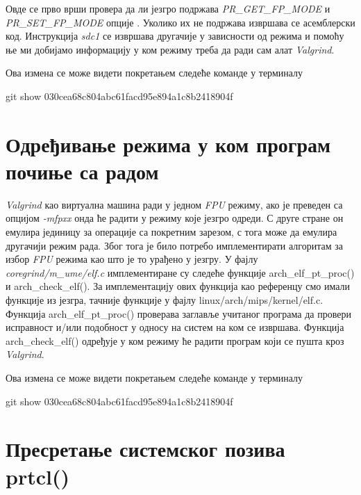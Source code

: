 \documentclass[12pt,oneside]{memoir}
\begin{document}
\indent Овде се прво врши провера да ли језгро подржава \textit{PR\_GET\_FP\_MODE} и \textit{PR\_SET\_FP\_MODE} опције . Уколико их не подржава извршава се асемблерски код. Инструкција \textit{sdc1} се извршава другачије у зависности од режима и помоћу ње ми добијамо информацију у ком режиму треба да ради сам алат \textit{Valgrind}.

Ова измена се може видети покретањем следеће команде у терминалу

\begin{center}
git show 030cea68c804abc61facd95e894a1c8b2418904f
\end{center}

\section{Одређивање режима у ком програм почиње са радом}


\indent \textit{Valgrind} као виртуална машина ради у једном \textit{FPU} режиму, ако је преведен са опцијом  \textit{-mfpxx} онда ће радити у режиму које језгро одреди. С друге стране он емулира јединицу за операције са покретним зарезом, с тога може да емулира другачији режим рада. Због тога је било потребо имплементирати алгоритам за избор \textit{FPU} режима као што је то урађено у језгру. У фајлу \textit{coregrind/m\_ume/elf.c} имплементиране су следеће функције arch\_elf\_pt\_proc() и arch\_check\_elf(). За имплементацију ових функција као референцу смо имали функције из језгра, тачније функције у фајлу 
linux/arch/mips/kernel/elf.c. Функција arch\_elf\_pt\_proc() проверава заглавље учитаног програма да провери исправност и/или подобност у односу на систем на ком се извршава. Функција arch\_check\_elf() одређује у ком режиму ће радити програм који се пушта кроз \textit{Valgrind}.

Ова измена се може видети покретањем следеће команде у терминалу

\begin{center}
git show 030cea68c804abc61facd95e894a1c8b2418904f
\end{center}

\section{Пресретање системског позива prtcl()}
\end{document}
